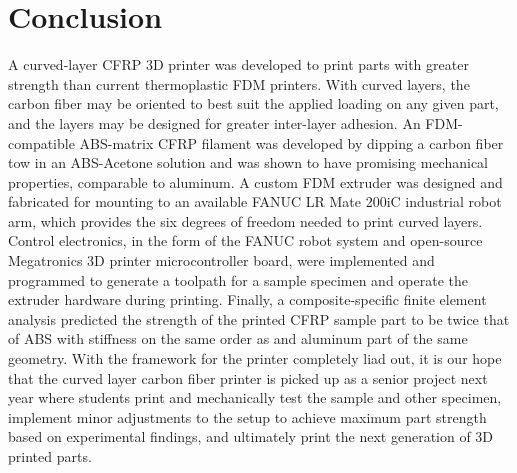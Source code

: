 \section{Conclusion}

\indent

A curved-layer CFRP 3D printer was developed to print parts with greater strength than current thermoplastic FDM printers. With curved layers, the carbon fiber may be oriented to best suit the applied loading on any given part, and the layers may be designed for greater inter-layer adhesion. An FDM-compatible ABS-matrix CFRP filament was developed by dipping a carbon fiber tow in an ABS-Acetone solution and was shown to have promising mechanical properties, comparable to aluminum. A custom FDM extruder was designed and fabricated for mounting to an available FANUC LR Mate 200iC industrial robot arm, which provides the six degrees of freedom needed to print curved layers. Control electronics, in the form of the FANUC robot system and open-source Megatronics 3D printer microcontroller board, were implemented and programmed to generate a toolpath for a sample specimen and operate the extruder hardware during printing. Finally, a composite-specific finite element analysis predicted the strength of the printed CFRP sample part to be twice that of ABS with stiffness on the same order as and aluminum part of the same geometry. With the framework for the printer completely liad out, it is our hope that the curved layer carbon fiber printer is picked up as a senior project next year where students print and mechanically test the sample and other specimen, implement minor adjustments to the setup to achieve maximum part strength based on experimental findings, and ultimately print the next generation of 3D printed parts.\\


